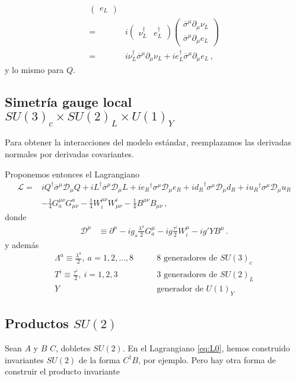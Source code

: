 \begin{frame}
\begin{align*}
\begin{pmatrix}
       e_L
    \end{pmatrix}\nonumber\\
=&
  i\begin{pmatrix}
    \nu_L^{\dagger} & e_L^{\dagger}
  \end{pmatrix}
    \begin{pmatrix}
      \overline{\sigma}^{\mu}\partial_{\mu}\nu_L\\
       \overline{\sigma}^{\mu}\partial_{\mu}e_L
    \end{pmatrix}\nonumber\\
=&i\nu_L^{\dagger}\overline{\sigma}^{\mu}\partial_{\mu}\nu_L+i
e_L^{\dagger}\overline{\sigma}^{\mu}\partial_{\mu}e_L\,,
\end{align*}
y lo mismo para $Q$.

\subsection*{Simetría gauge local $SU(3)_c\times  SU(2)_L\times  U(1)_Y$}

Para obtener la interacciones del modelo estándar, reemplazamos las derivadas normales por derivadas covariantes.

Proponemos entonces el Lagrangiano
\begin{align}
\label{eq:L0}
     \mathcal{L}=&i{Q}^{\dagger}\overline{\sigma}^\mu\mathcal{D}_\mu Q+i{L}^{\dagger}\overline{\sigma}^\mu\mathcal{D}_\mu L+
i{e_R}^{\dagger}\sigma^\mu\mathcal{D}_\mu {e_R}+i{d_R}^{\dagger}\sigma^\mu\mathcal{D}_\mu {d_R}+i{u_R}^{\dagger}\sigma^\mu\mathcal{D}_\mu {u_R}
\nonumber\\
     &-\tfrac{1}{4}G^{\mu\nu}_a G_{\mu\nu}^a-\tfrac{1}{4}W^{\mu\nu}_i W_{\mu\nu}^i-\tfrac{1}{4}B^{\mu\nu} B_{\mu\nu}\,,
\end{align}
donde
\begin{align}
  \mathcal{D}^\mu&\equiv\partial^\mu-i g_s\frac{\lambda^a}{2}G^\mu_a-i g \frac{\tau^i}{2}W^\mu_i-i g'YB^\mu\,.
\end{align}
y además
\begin{align*}
  \Lambda^a\equiv\frac{\lambda^a}{2},\ a=1,2,\ldots,8 &\qquad\text{8 generadores de $SU(3)_c$}\\
  T^i\equiv\frac{\tau^i}{2},\ i=1,2,3 &\qquad\text{3 generadores de $SU(2)_L$}\\
  Y &\qquad\text{generador de $U(1)_Y$}
\end{align*}


\subsection{Productos $SU(2)$}
Sean $A$ y $B$ $C$, dobletes $SU(2)$. En el Lagrangiano \eqref{eq:L0}, hemos construido invariantes $SU(2)$ de la forma $C^{\dagger}B$, por ejemplo. Pero hay otra forma de construir el producto invariante


\end{frame}
